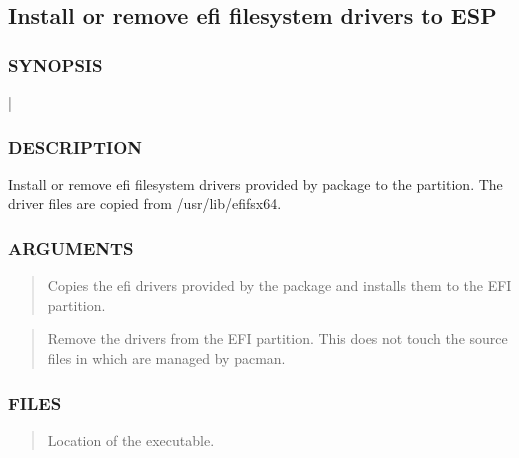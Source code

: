\documentclass[letterpaper,11pt,english]{sphinxmanual}
\begin{document}
\subsection{Install or remove efi filesystem drivers to ESP}
\label{\detokenize{_build/man-ready/sd-boot-efifs-update.8:install-or-remove-efi-filesystem-drivers-to-esp}}

\subsubsection{SYNOPSIS}
\label{\detokenize{_build/man-ready/sd-boot-efifs-update.8:synopsis}}
\sphinxAtStartPar
{}  | 


\subsubsection{DESCRIPTION}
\label{\detokenize{_build/man-ready/sd-boot-efifs-update.8:description}}
\sphinxAtStartPar
Install or remove efi filesystem drivers provided by  package to the  partition.
The driver files are copied from /usr/lib/efifs\sphinxhyphen{}x64.


\subsubsection{ARGUMENTS}
\label{\detokenize{_build/man-ready/sd-boot-efifs-update.8:arguments}}
\sphinxAtStartPar
{}
\begin{quote}

\sphinxAtStartPar
Copies the efi drivers provided by the package and installs them
to the EFI partition.
\end{quote}

\sphinxAtStartPar
{}
\begin{quote}

\sphinxAtStartPar
Remove the drivers from the EFI partition. This does not touch the source files
in  which are managed by pacman.
\end{quote}


\subsubsection{FILES}
\label{\detokenize{_build/man-ready/sd-boot-efifs-update.8:files}}
\sphinxAtStartPar
{}
\begin{quote}

\sphinxAtStartPar
Location of the executable.
\end{quote}
\end{document}
